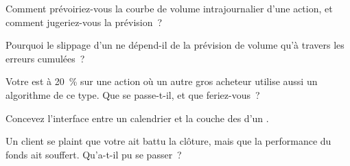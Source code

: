 \begin{interviewq}\label{iq:mx:benchmark-algorithms:2}
Comment prévoiriez-vous la courbe de volume intrajournalier d'une action, et comment jugeriez-vous la prévision~?
\end{interviewq}

\begin{interviewq}\label{iq:mx:benchmark-algorithms:3}
Pourquoi le slippage d'un  ne dépend-il de la prévision de volume qu'à travers les erreurs cumulées~?
\end{interviewq}

\begin{interviewq}\label{iq:mx:benchmark-algorithms:4}
Votre  est à 20~\% sur une action où un autre gros acheteur utilise aussi un algorithme de ce type. Que se passe-t-il, et que feriez-vous~?
\end{interviewq}

\begin{interviewq}\label{iq:mx:benchmark-algorithms:5}
Concevez l'interface entre un calendrier et la couche des  d'un .
\end{interviewq}

\begin{interviewq}\label{iq:mx:benchmark-algorithms:6}
Un client se plaint que votre  ait battu la clôture, mais que la performance du fonds ait souffert. Qu'a-t-il pu se passer~?
\end{interviewq}
